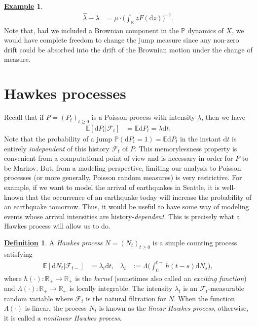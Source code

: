 \documentclass[12pt]{book}
\numberwithin{equation}{chapter}
\theoremstyle{plain}
\numberwithin{theorem}{section}
\theoremstyle{definition}
\newtheorem{definition}[theorem]{\underline{Definition}}
\newtheorem{example}[theorem]{\underline{Example}}
\numberwithin{exercise}{chapter}
\newcommand{\<}{\langle}
\renewcommand{\>}{\rangle}
\renewcommand{\(}{\left(}
\renewcommand{\)}{\right)}
\renewcommand{\[}{\left[}
\renewcommand{\]}{\right]}
\newcommand\Eb{\mathds{E}}
\newcommand\Pb{\mathds{P}}
\newcommand\Rb{\mathds{R}}
\newcommand\Fc{\mathscr{F}}
\newcommand\Lam{\Lambda}
\newcommand\lam{\lambda}
\newcommand\lamh{\widehat{\lam}}
\newcommand\dd{\mathrm{d}}
\newcommand{\blu}[1]{\textcolor{blue}{#1}}
\begin{document}
\begin{example}
\begin{align}
\lamh - \lam
	&=	\mu \cdot \Big( \int_\Rb z F(\dd z) \Big)^{-1} .
\end{align}
Note that, had we included a Brownian component in the $\Pb$ dynamics of $X$, we would have complete freedom to change the jump measure since any non-zero drift could be absorbed into the drift of the Brownian motion under the change of measure.
\end{example}

\section{Hawkes processes}
\label{sec:hawkes}
Recall that if $P = (P_t)_{t \geq 0}$ is a Poisson process with intensity $\lam$, then we have
\begin{align}
\Eb[ \dd P_t | \Fc_t ]
	&=	\Eb \dd P_t  
	=		\lam \dd t .
\end{align}
Note that the probability of a jump $\Pb( \dd P_t = 1 ) = \Eb \dd P_t$ in the instant $\dd t$ is entirely \emph{independent} of this history $\Fc_t$ of $P$.  This memorylessness property is convenient from a computational point of view and is necessary in order for $P$ to be Markov.  But, from a modeling perspective, limiting our analysis to Poisson processes (or more generally, Poisson random measures) is very restrictive.  For example, if we want to model the arrival of earthquakes in Seattle, it is well-known that the occurrence of an earthquake today will increase the probability of an earthquake tomorrow.  Thus, it would be useful to have some way of modeling events whose arrival intensities are history-\emph{dependent}.  This is precisely what a Hawkes process will allow us to do.

\begin{definition}
A \emph{Hawkes process} $N=(N_t)_{t \geq 0}$ is a simple counting process satisfying
\begin{align}
\Eb[ \dd N_t | \Fc_{t-} ]
	&=	\lam_t \dd t , &
\lambda_t
	&:=	\Lam \Big( \int_0^{t-} h(t-s) \dd N_s \Big), \label{eq:lambda-0}
\end{align}
where $h(\cdot):\Rb_+ \rightarrow \Rb_+$ is the \emph{kernel} (sometimes also called an \emph{exciting function}) and $\Lam(\cdot):\Rb_+ \to \Rb_+$ is locally integrable.  The intensity $\lambda_t$ is an $\Fc_t$-measurable random variable where $\Fc_t$ is the natural filtration for $N$.  When the function $\Lam(\cdot)$ is linear, the process $N_t$ is known as the \emph{linear Hawkes process}, otherwise, it is called a \emph{nonlinear Hawkes process}.
\end{definition}
\end{document}

